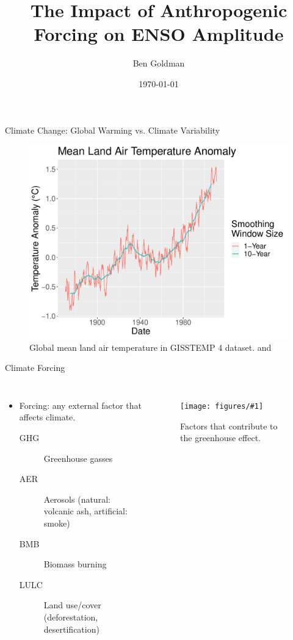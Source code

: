 \documentclass[aspectratio=1610]{beamer}
\title{The Impact of Anthropogenic Forcing on ENSO Amplitude}
\author{Ben Goldman}
\date{\today}
\newcommand{\myfig}[3]{
  \begin{figure}
    \centering
    \texttt{[image: figures/\#1]}
    \caption{#2}
    \label{fig:#3}
  \end{figure}
}
\begin{document}
\maketitle

\begin{frame}{Climate Change: Global Warming vs. Climate Variability}
  \begin{figure}
    \centering
    \includegraphics[width=0.9\textheight]{figures/intro_fig_3.pdf}
    \caption{Global mean land air temperature in GISSTEMP 4 dataset. \citep{gistemp2019giss} and \citep{lenssen2019improvements}}
    \label{fig:woohoo}
  \end{figure}
\end{frame}

\begin{frame}{Climate Forcing}
  \begin{columns}
    \begin{itemize}
    \item \alert{Forcing}: any external factor that affects climate.
      \begin{description}
      \item[\alert{GHG}] Greenhouse gasses
      \item[\alert{AER}] Aerosols (natural: volcanic ash, artificial: smoke)
      \item[\alert{BMB}] Biomass burning
      \item[\alert{LULC}] Land use/cover (deforestation, desertification)
      \end{description}
    \end{itemize}
    \myfig{greenhouse_Effect.jpg}{Factors that contribute to the greenhouse effect.}{this}
  \end{columns}
\end{frame}
\end{document}
